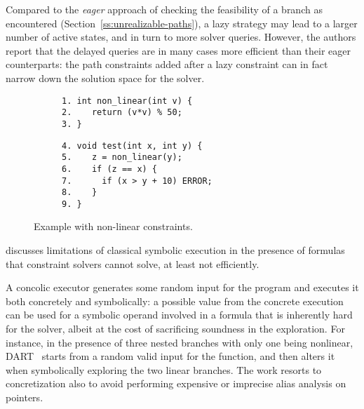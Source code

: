 Compared to the {\em eager} approach of checking the feasibility of a branch as encountered (Section~\ref{ss:unrealizable-paths}), a lazy strategy may lead to a larger number of active states, and in turn to more solver queries. However, the authors report that the delayed queries are in many cases more efficient than their eager counterparts: the path constraints added after a lazy constraint can in fact narrow down the solution space for the solver.

\begin{figure}[t]
  \begin{center}
  \begin{subfigure}{.4\textwidth}
    \vspace{0mm}
    \begin{lstlisting}[basicstyle=\ttfamily\scriptsize]
1. int non_linear(int v) {
2.    return (v*v) % 50;
3. }
    \end{lstlisting}
    \vspace{8.5mm}
  \end{subfigure}%
    \begin{subfigure}{.4\textwidth}
    \begin{lstlisting}[basicstyle=\ttfamily\scriptsize]
4. void test(int x, int y) {
5.    z = non_linear(y);
6.    if (z == x) {
7.      if (x > y + 10) ERROR;  
8.    }
9. }
    \end{lstlisting}
  \end{subfigure}%
  \end{center}
  \vspace{-3.5mm}
  \caption{Example with non-linear constraints.}
  \label{fi:non-linear-constraints}
\end{figure}


\cite{CS-CACM13} discusses limitations of classical symbolic execution in the presence of formulas that constraint solvers cannot solve, at least not efficiently.


\noindent A concolic executor generates some random input for the program and executes it both concretely and symbolically: a possible value from the concrete execution can be used for a symbolic operand involved in a formula that is inherently hard for the solver, albeit at the cost of sacrificing soundness in the exploration. For instance, in the presence of three nested branches with only one being nonlinear, {\sc DART}~\cite{DART-PLDI05} starts from a random valid input for the function, and then alters it when symbolically exploring the two linear branches. The work resorts to concretization also to avoid performing expensive or imprecise alias analysis on pointers. %

